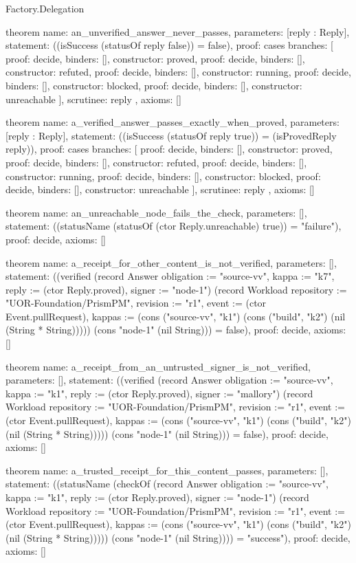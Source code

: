 \begin{lexlean}{Factory.Delegation}
\begin{semanticmodule}
theorem{
  name: an_unverified_answer_never_passes,
  parameters: [reply : Reply],
  statement: ((isSuccess (statusOf reply false)) = false),
  proof: cases{
    branches: [
      {proof: decide{}, binders: [], constructor: proved},
      {proof: decide{}, binders: [], constructor: refuted},
      {proof: decide{}, binders: [], constructor: running},
      {proof: decide{}, binders: [], constructor: blocked},
      {proof: decide{}, binders: [], constructor: unreachable}
    ],
    scrutinee: reply
  },
  axioms: []
}

theorem{
  name: a_verified_answer_passes_exactly_when_proved,
  parameters: [reply : Reply],
  statement: ((isSuccess (statusOf reply true)) = (isProvedReply reply)),
  proof: cases{
    branches: [
      {proof: decide{}, binders: [], constructor: proved},
      {proof: decide{}, binders: [], constructor: refuted},
      {proof: decide{}, binders: [], constructor: running},
      {proof: decide{}, binders: [], constructor: blocked},
      {proof: decide{}, binders: [], constructor: unreachable}
    ],
    scrutinee: reply
  },
  axioms: []
}

theorem{
  name: an_unreachable_node_fails_the_check,
  parameters: [],
  statement: ((statusName (statusOf (ctor Reply.unreachable) true)) = "failure"),
  proof: decide{},
  axioms: []
}

theorem{
  name: a_receipt_for_other_content_is_not_verified,
  parameters: [],
  statement: ((verified (record Answer {obligation := "source-vv", kappa := "k7", reply := (ctor Reply.proved), signer := "node-1"}) (record Workload {repository := "UOR-Foundation/PrismPM", revision := "r1", event := (ctor Event.pullRequest), kappas := (cons ("source-vv", "k1") (cons ("build", "k2") (nil (String * String))))}) (cons "node-1" (nil String))) = false),
  proof: decide{},
  axioms: []
}

theorem{
  name: a_receipt_from_an_untrusted_signer_is_not_verified,
  parameters: [],
  statement: ((verified (record Answer {obligation := "source-vv", kappa := "k1", reply := (ctor Reply.proved), signer := "mallory"}) (record Workload {repository := "UOR-Foundation/PrismPM", revision := "r1", event := (ctor Event.pullRequest), kappas := (cons ("source-vv", "k1") (cons ("build", "k2") (nil (String * String))))}) (cons "node-1" (nil String))) = false),
  proof: decide{},
  axioms: []
}

theorem{
  name: a_trusted_receipt_for_this_content_passes,
  parameters: [],
  statement: ((statusName (checkOf (record Answer {obligation := "source-vv", kappa := "k1", reply := (ctor Reply.proved), signer := "node-1"}) (record Workload {repository := "UOR-Foundation/PrismPM", revision := "r1", event := (ctor Event.pullRequest), kappas := (cons ("source-vv", "k1") (cons ("build", "k2") (nil (String * String))))}) (cons "node-1" (nil String)))) = "success"),
  proof: decide{},
  axioms: []
}


\end{semanticmodule}
\end{lexlean}
